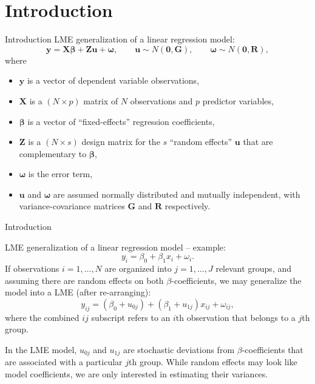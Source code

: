 \documentclass{beamer}
\begin{document}
\section{Introduction}
\begin{frame}{Introduction}
LME generalization of a linear regression model:
\medskip
$$
    \bm{y} = \bm{X \beta} + \bm{Z u} + \bm{\omega},  
    \qquad \bm{u} \sim N(\bm{0}, \bm{G}),
    \qquad \bm{\omega} \sim N(\bm{0}, \bm{R}),
$$
\medskip
\small
where 
\begin{itemize}
    \item[] $\bm{y}$ is a vector of dependent variable observations,
    \item[] $\bm{X}$ is a $(N\! \times \! p)$ matrix of $N$ observations and $p$ predictor variables,
    \item[] $\bm{\beta}$ is a vector of ``fixed-effects'' regression coefficients,
    \item[] $\bm{Z}$ is a $(N\! \times \! s)$ design matrix for the $s$ ``random effects'' $\bm{u}$ that are complementary to $\bm{\beta}$,
    \item[] $\bm{\omega}$ is the error term,
    \item[] $\bm{u}$ and $\bm{\omega}$ are assumed normally distributed and mutually independent, with variance-covariance matrices $\bm{G}$ and $\bm{R}$ respectively.
\end{itemize}   
\end{frame}
\begin{frame}{Introduction}

LME generalization of a linear regression model -- example: 
$$y_i = \beta_0 + \beta_1 x_i + \omega_i.$$ 
If observations $i=1,\dots,N$ are organized into $j=1,\dots,J$ relevant groups, and assuming there are random effects on both $\beta$-coefficients, we may generalize the model into a LME (after re-arranging):
$$y_{ij} = (\beta_0 + u_{0j}) + (\beta_1 + u_{1j}) x_{ij} + \omega_{ij},$$
where the combined $ij$ subscript refers to an $i$th observation that belongs to a $j$th group. 

\medskip
In the LME model, $u_{0j}$ and $u_{1j}$ are stochastic deviations from $\beta$-coefficients that are associated with a particular $j$th group. While random effects may look like model coefficients, we are only interested in estimating their variances. 
\end{frame}
\end{document}
